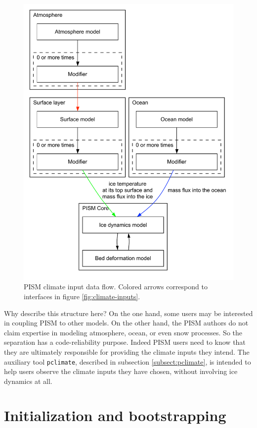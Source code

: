 \documentclass[titlepage,letterpaper,final]{scrartcl}
\begin{document}
\begin{figure}
  \centering
  \includegraphics[width=5in]{figs/data-flow.pdf}
  \caption{PISM climate input data flow. Colored arrows correspond to interfaces in
    figure \ref{fig:climate-inputs}.}
  \label{fig:climate-input-data-flow}
\end{figure}

Why describe this structure here? On the one hand, some users may be interested
in coupling PISM to other models. On the other hand, the PISM authors do not
claim expertise in modeling atmosphere, ocean, or even snow processes.   So the
separation has a code-reliability purpose. Indeed PISM users need to know that
they are ultimately responsible for providing the climate inputs they intend.
The auxiliary tool \texttt{pclimate}, described in subsection
\ref{subsect:pclimate}, is intended to help users observe the climate inputs
they have chosen, without involving ice dynamics at all.

\clearpage
\newpage
\section{Initialization and bootstrapping}\label{sect:boot}  
\end{document}

